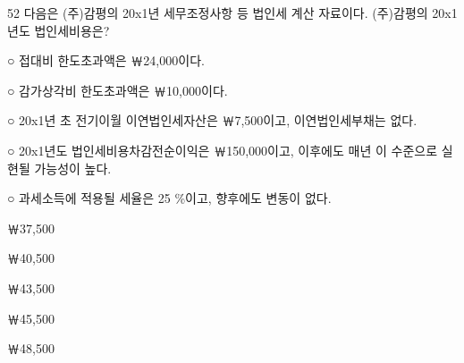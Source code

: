 \begin{question}{52}
다음은 (주)감평의 20x1년 세무조정사항 등 법인세 계산 자료이다. (주)감평의 20x1년도 법인세비용은?
\begin{framedtext}
○ 접대비 한도초과액은 ￦24,000이다. \par
○ 감가상각비 한도초과액은 ￦10,000이다. \par
○ 20x1년 초 전기이월 이연법인세자산은 ￦7,500이고, 이연법인세부채는 없다. \par
○ 20x1년도 법인세비용차감전순이익은 ￦150,000이고, 이후에도 매년 이 수준으로 실현될 가능성이 높다. \par
○ 과세소득에 적용될 세율은 25 \%이고, 향후에도 변동이 없다. \par
\end{framedtext}
\begin{choices}
  \item ￦37,500
  \item ￦40,500
  \item ￦43,500
  \item ￦45,500
  \item ￦48,500
\end{choices}
\end{question}

